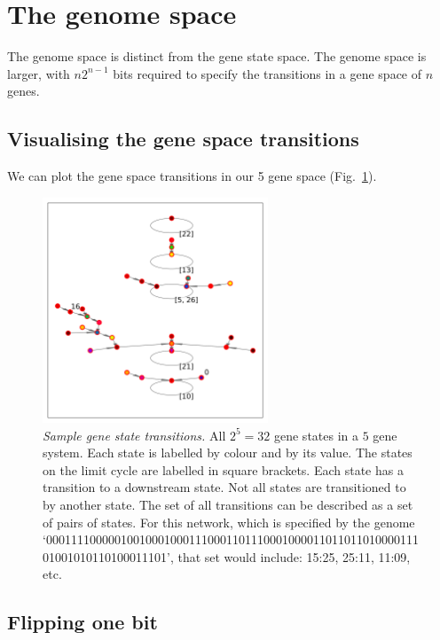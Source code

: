 \documentclass[11pt, a4paper]{article}
\begin{document}
\section{The genome space}

The genome space is distinct from the gene state space. The genome
space is larger, with $n 2^{n-1}$ bits required to specify the
transitions in a gene space of $n$ genes.

\subsection{Visualising the gene space transitions}

We can plot the gene space transitions in our 5 gene space (Fig.~\ref{fig:genetrans}).

\begin{figure}
\begin{center}
\includegraphics[width=0.6\textwidth,clip=true,trim=0cm 0cm 0cm 0cm]{states_bitflips_flip000.png}
\caption{\emph{Sample gene state transitions.} All $2^5=32$ gene
states in a $5$ gene system. Each state is labelled by colour and by
its value. The states on the limit cycle are labelled in square
brackets. Each state has a transition to a downstream state. Not all
states are transitioned to by another state. The set of all
transitions can be described as a set of pairs of states. For this
network, which is specified by the genome `00011110000010010001000111000110111000100001101101101000011101001010110100011101', that set would include: 15:25, 25:11, 11:09, etc.}
\label{fig:genetrans}
\end{center}
\end{figure}

\subsection{Flipping one bit}
\end{document}
